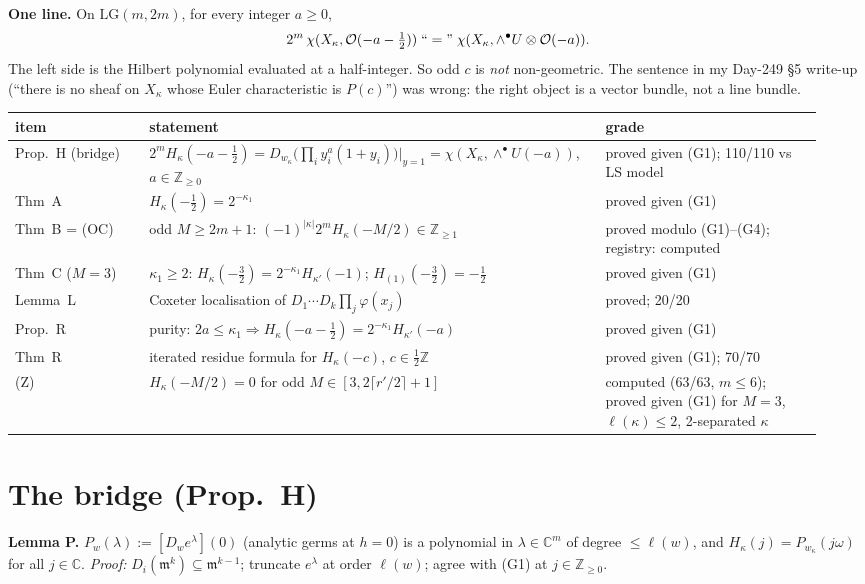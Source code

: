\documentclass[10pt]{article}
\newcommand{\LG}{\mathrm{LG}}
\begin{document}
\textbf{One line.} On $\LG(m,2m)$, for every integer $a\ge0$,
\[2^m\,\chi(X_\kappa,\mathcal O(-a-\tfrac12))\;``="\;\chi(X_\kappa,\wedge^\bullet U\otimes\mathcal O(-a)).\]
The left side is the Hilbert polynomial evaluated at a half-integer. So odd $c$ is \emph{not} non-geometric.
The sentence in my Day-249 \S5 write-up (``there is no sheaf on $X_\kappa$ whose Euler characteristic is $P(c)$'') was wrong:
the right object is a vector bundle, not a line bundle.

\medskip
\begin{tabular}{@{}p{0.16\linewidth}p{0.52\linewidth}p{0.26\linewidth}@{}}
\toprule
item & statement & grade\\\midrule
Prop.~H (bridge) & $2^mH_\kappa(-a-\frac12)=D_{w_\kappa}\bigl(\prod_iy_i^a(1+y_i)\bigr)|_{y=1}=\chi(X_\kappa,\wedge^\bullet U(-a))$, $a\in\mathbb Z_{\ge0}$ & proved given (G1); 110/110 vs LS model\\
Thm~A & $H_\kappa(-\frac12)=2^{-\kappa_1}$ & proved given (G1)\\
Thm~B = (OC) & odd $M\ge2m+1$: $(-1)^{|\kappa|}2^mH_\kappa(-M/2)\in\mathbb Z_{\ge1}$ & proved modulo (G1)--(G4); registry: computed\\
Thm~C ($M=3$) & $\kappa_1\ge2$: $H_\kappa(-\frac32)=2^{-\kappa_1}H_{\kappa'}(-1)$; $H_{(1)}(-\frac32)=-\frac12$ & proved given (G1)\\
Lemma~L & Coxeter localisation of $D_1\cdots D_k\prod_j\varphi(x_j)$ & proved; 20/20\\
Prop.~R & purity: $2a\le\kappa_1\Rightarrow H_\kappa(-a-\frac12)=2^{-\kappa_1}H_{\kappa'}(-a)$ & proved given (G1)\\
Thm~R & iterated residue formula for $H_\kappa(-c)$, $c\in\frac12\mathbb Z$ & proved given (G1); 70/70\\
(Z) & $H_\kappa(-M/2)=0$ for odd $M\in[3,2\lceil r'/2\rceil+1]$ & computed (63/63, $m\le6$); proved given (G1) for $M=3$, $\ell(\kappa)\le2$, 2-separated $\kappa$\\
\bottomrule
\end{tabular}

\section{The bridge (Prop.~H)}

\textbf{Lemma P.} $P_w(\lambda):=[D_we^\lambda](0)$ (analytic germs at $h=0$) is a polynomial in $\lambda\in\mathbb C^m$ of
degree $\le\ell(w)$, and $H_\kappa(j)=P_{w_\kappa}(j\omega)$ for all $j\in\mathbb C$. \emph{Proof:} $D_i(\mathfrak m^k)\subseteq\mathfrak m^{k-1}$;
truncate $e^\lambda$ at order $\ell(w)$; agree with (G1) at $j\in\mathbb Z_{\ge0}$.
\end{document}
